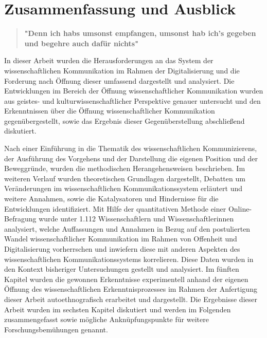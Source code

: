 \chapter{Zusammenfassung und Ausblick}

\begin{quote}
\textbf{"Denn ich habs umsonst empfangen, umsonst hab ich's gegeben und begehre auch dafür nichts"}
\end{quote} \cite{luther_1876}

In dieser Arbeit wurden die Herausforderungen an das System der wissenschaftlichen Kommunikation im Rahmen der Digitalisierung und die Forderung nach Öffnung dieser umfassend dargestellt und analysiert. Die Entwicklungen im Bereich der Öffnung wissenschaftlicher Kommunikation wurden aus geistes- und kulturwissenschaftlicher Perspektive genauer untersucht und den Erkenntnissen über die Öffnung wissenschaftlicher Kommunikation gegenübergestellt, sowie das Ergebnis dieser Gegenüberstellung abschließend diskutiert.

Nach einer Einführung in die Thematik des wissenschaftlichen Kommunizierens, der Ausführung des Vorgehens und der Darstellung die eigenen Position und der Beweggründe, wurden die methodischen Herangehensweisen beschrieben. Im weiteren Verlauf wurden theoretischen Grundlagen dargestellt, Debatten um Veränderungen im wissenschaftlichen Kommunikationssystem erläutert und weitere Annahmen, sowie die Katalysatoren und Hindernisse für die Entwicklungen identifiziert. Mit Hilfe der quantitativen Methode einer Online-Befragung wurde unter 1.112 Wissenschaftlern und Wissenschaftlerinnen analysiert, welche Auffassungen und Annahmen in Bezug auf den postulierten Wandel wissenschaftlicher Kommunikation im Rahmen von Offenheit und Digitalisierung vorherrschen und inwiefern diese mit anderen Aspekten des wissenschaftlichen Kommunikationssystems korrelieren. Diese Daten wurden in den Kontext bisheriger Untersuchungen gestellt und analysiert. Im fünften Kapitel wurden die gewonnen Erkenntnisse experimentell anhand der eigenen Öffnung des wissenschaftlichen Erkenntnisprozesses im Rahmen der Anfertigung dieser Arbeit autoethnografisch erarbeitet und dargestellt. Die Ergebnisse dieser Arbeit wurden im sechsten Kapitel diskutiert und werden im Folgenden zusammengefasst sowie mögliche Anknüpfungspunkte für weitere Forschungsbemühungen genannt.

